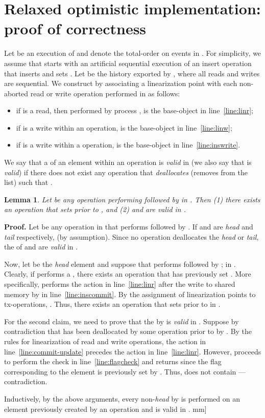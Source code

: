 \documentclass[11pt,pdftex,letterpaper]{article}
\newtheorem{lemma}[theorem]{Lemma}
\newenvironment{proof}[1][Proof]{\noindent\textbf{#1.} }{\hfill \2mm]}
\begin{document}
\section{Relaxed optimistic implementation: proof of correctness}
\label{app:lltm}
Let  be an execution of  and 
denote the total-order on events in .
For simplicity, we assume that  starts with an artificial
sequential execution of an insert operation  that inserts  and sets . 
Let  be the history exported by , where 
all reads and writes are sequential. 
We construct  by associating a linearization point  with each
non-aborted read or write operation  performed in   
as follows:
\begin{itemize}
\item  if  is a read, then performed by process ,
   is the base-object  in line~\ref{line:linr};
\item  if  is a write within an  operation,
   is the base-object  in line~\ref{line:linw};
\item  if  is a write  within a  operation,
   is the base-object   in line~\ref{line:inswrite}.
\end{itemize}
We say that a  of an element  within an operation 
is \emph{valid} in  
(we also say that  is \emph{valid}) if 
there does not exist any  operation  that \emph{deallocates}  (removes  from the list)
such that . 
\begin{lemma}
\label{lem:invar1}
Let  be any operation performing  followed by  in . 
Then (1) there exists an  operation that sets  prior to , and
(2)  and  are \emph{valid} in .
\end{lemma}
\begin{proof} 
Let  be any operation in  that performs  followed by .
If  and  are \emph{head} and \emph{tail} respectively,  (by assumption). Since no  operation
deallocates the \emph{head} or \emph{tail}, the  of  and  are \emph{valid} in .

Now, let  be the \emph{head} element and suppose that  performs  followed by ;  in .
Clearly, if  performs a , there exists an
operation  that has previously set .
More specifically,  performs the action in line~\ref{line:linr} after the
write to shared memory by  in line~\ref{line:inscommit}. 
By the assignment of linearization points to tx-operations, .
Thus, there exists an  operation that sets  prior to  in .

For the second claim, we need to prove that the  by  is \emph{valid} in .
Suppose by contradiction that  has been deallocated by some  operation prior to  by .
By the rules for linearization of read and write operations, the action in line~\ref{line:commit-update} precedes the action in line~\ref{line:linr}.
However,  proceeds to perform the check in line~\ref{line:flagcheck} and returns  since the flag corresponding to the element  is previously set by . Thus,  does not contain ---contradiction.


Inductively, by the above arguments, every non-\emph{head}  by  
is performed on an element previously created by an  operation
and is valid in .
\end{proof} 
\end{document}
